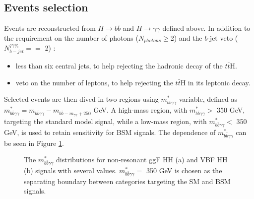 \subsection{Events selection}
\label{HHyybb:ObjEvt:Evt}
Events are reconstructed from $H\to b\bar{b}$ and $H\to\gamma\gamma$ defined above. In addition to the requirement on the number of photons ($N_{photons} \geq $2) and the $b$-jet veto ($N_{b-jet}^{77\%} == $ 2) : 

\begin{itemize}
    \protect
    \item less than six central jets, to help rejecting the hadronic decay of the $t\bar{t}$H. 
    \item veto on the number of leptons, to help rejecting the $t\bar{t}$H in its leptonic decay.  
\end{itemize}

Selected events are then dived in two regions using $m_{b\bar{b}\gamma\gamma}^*$ variable, defined as  $m_{b\bar{b}\gamma\gamma}^* = m_{b\bar{b}\gamma\gamma} - m_{b\bar{b} - m_{\gamma\gamma} + 250}$ GeV. A high-mass region, with $m_{b\bar{b}\gamma\gamma}^* > $ 350 GeV, targeting the standard model signal, while a low-mass region, with $m_{b\bar{b}\gamma\gamma}^* < $ 350 GeV, is used to retain sensitivity for BSM signals. The dependence of $m_{b\bar{b}\gamma\gamma}^*$ can be seen in Figure \ref{fig:HHyybb:ObjEvt:Evt:myybb}. 
\begin{figure}[ht]
    \centering
    \caption{The $m_{b\bar{b}\gamma\gamma}^*$ distributions for non-resonant ggF HH (a) and VBF HH (b) signals with several \kl values. $m_{b\bar{b}\gamma\gamma}^* = $ 350 GeV is chosen as the separating boundary between categories targeting the SM and BSM \kl signals.}
    \label{fig:HHyybb:ObjEvt:Evt:myybb}
\end{figure}

